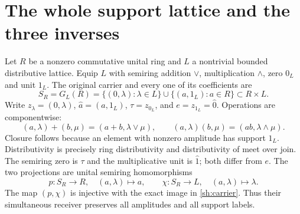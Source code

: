 \documentclass[11pt]{article}
\begin{document}
\section{The whole support lattice and the three inverses}

Let $R$ be a nonzero commutative unital ring and $L$ a nontrivial
bounded distributive lattice.  Equip $L$ with semiring addition
$\vee$, multiplication $\wedge$, zero $0_L$ and unit $1_L$.
The original carrier and every one of its coefficients are
\begin{equation}\tag{SH1}\label{sh:carrier}
 S_R=G_L(R)=\{(0,\lambda):\lambda\in L\}
          \cup\{(a,1_L):a\in R\}\subset R\times L.
\end{equation}
Write $z_\lambda=(0,\lambda)$, $\widehat a=(a,1_L)$,
$\tau=z_{0_L}$, and $e=z_{1_L}=\widehat0$.
Operations are componentwise:
\begin{equation}\tag{SH2}\label{sh:operations}
 (a,\lambda)+(b,\mu)=(a+b,\lambda\vee\mu),\qquad
 (a,\lambda)(b,\mu)=(ab,\lambda\wedge\mu).
\end{equation}
Closure follows because an element with nonzero amplitude has
support $1_L$. Distributivity is precisely ring distributivity and
distributivity of meet over join. The semiring zero is $\tau$ and
the multiplicative unit is $\widehat1$; both differ from $e$.
The two projections are unital semiring homomorphisms
\begin{equation}\tag{SH3}\label{sh:projections}
 p:S_R\to R,\quad(a,\lambda)\mapsto a,\qquad
 \chi:S_R\to L,\quad(a,\lambda)\mapsto\lambda.
\end{equation}
The map $(p,\chi)$ is injective with the exact image in
\eqref{sh:carrier}. Thus their simultaneous receiver preserves all
amplitudes and all support labels.
\end{document}

